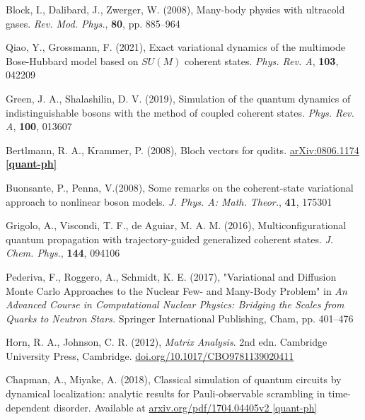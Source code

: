 \documentclass[12pt]{report}
\begin{document}
\begin{thebibliography}{10}
	Block, I., Dalibard, J., Zwerger, W. (2008), Many-body physics with ultracold gases. \textit{Rev. Mod. Phys.}, \textbf{80}, pp. 885--964
	
	Qiao, Y., Grossmann, F. (2021), Exact variational dynamics of the multimode Bose-Hubbard model based on $SU(M)$ coherent states. \textit{Phys. Rev. A}, \textbf{103}, 042209
	
	Green, J. A., Shalashilin, D. V. (2019), Simulation of the quantum dynamics of indistinguishable bosons with the method of coupled coherent states. \textit{Phys. Rev. A}, \textbf{100}, 013607
	
	Bertlmann, R. A., Krammer, P. (2008), Bloch vectors for qudits. \href{ 	
https://doi.org/10.48550/arXiv.0806.1174}{arXiv:0806.1174 \textbf{[quant-ph]}}

	Buonsante, P., Penna, V.(2008), Some remarks on the coherent-state variational approach to nonlinear boson models. \textit{J. Phys. A: Math. Theor.}, \textbf{41}, 175301
	
	Grigolo, A., Viscondi, T. F., de Aguiar, M. A. M. (2016), Multiconfigurational quantum propagation with trajectory-guided generalized coherent states. \textit{J. Chem. Phys.}, \textbf{144}, 094106
	
	Pederiva, F., Roggero, A., Schmidt, K. E. (2017), "Variational and Diffusion Monte Carlo Approaches to the Nuclear Few- and Many-Body Problem" in \textit{An Advanced Course in Computational Nuclear Physics: Bridging the Scales from Quarks to Neutron Stars.} Springer International Publishing, Cham, pp. 401--476
	
	Horn, R. A., Johnson, C. R. (2012), \textit{Matrix Analysis}. 2nd edn. Cambridge University Press, Cambridge. \href{https://doi.org/10.1017/CBO9781139020411}{doi.org/10.1017/CBO9781139020411}
	
	Chapman, A., Miyake, A. (2018), Classical simulation of quantum circuits by dynamical localization: analytic results for Pauli-observable scrambling in time-dependent disorder. Available at \href{https://arxiv.org/pdf/1704.04405v2}{arxiv.org/pdf/1704.04405v2 [quant-ph]}

	\end{thebibliography}
	
	
	\appendix
	
	
	
	
	
	
	

	
	
\end{document}
